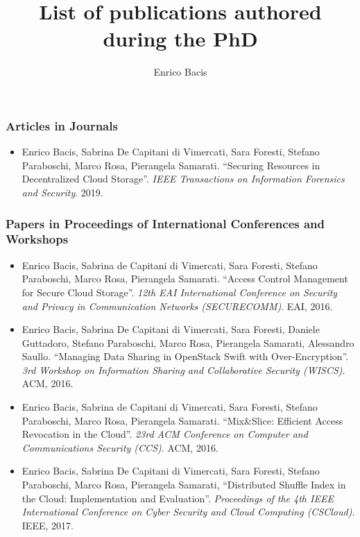 \documentclass[a4paper]{article}
\title{List of publications authored during the PhD}
\author{Enrico Bacis}
\date{}
\begin{document}
\maketitle

\begin{sloppy}
	
	\vspace{0.3em}
	
	\subsubsection*{Articles in Journals}
	\begin{itemize}
		\item Enrico Bacis, Sabrina De Capitani di Vimercati, Sara Foresti, Stefano Paraboschi,	Marco Rosa,	Pierangela Samarati. ``Securing Resources in Decentralized Cloud Storage''. {\em IEEE Transactions on Information Forensics and Security}. 2019.
	\end{itemize}
	
	\subsubsection*{Papers in Proceedings of International Conferences and Workshops}
	\begin{itemize}	

		\item Enrico Bacis, Sabrina de Capitani di Vimercati, Sara Foresti, Stefano Paraboschi, Marco Rosa, Pierangela Samarati. ``Access Control Management for Secure Cloud Storage''. {\em 12th EAI International Conference on Security and Privacy in Communication Networks (SECURECOMM)}. EAI, 2016.
		
		\item Enrico Bacis, Sabrina De Capitani di Vimercati, Sara Foresti, Daniele Guttadoro, Stefano Paraboschi, Marco Rosa, Pierangela Samarati, Alessandro Saullo. ``Managing Data Sharing in OpenStack Swift with Over-Encryption''. {\em 3rd Workshop on Information Sharing and Collaborative Security (WISCS)}. ACM, 2016.
		
		\item Enrico Bacis, Sabrina de Capitani di Vimercati, Sara Foresti, Stefano Paraboschi, Marco Rosa, Pierangela Samarati. ``Mix\&Slice: Efficient Access Revocation in the Cloud''. {\em 23rd ACM Conference on Computer and Communications Security (CCS)}. ACM, 2016.
		
		\item Enrico Bacis, Sabrina De Capitani di Vimercati, Sara Foresti, Stefano Paraboschi, Marco Rosa, Pierangela Samarati, ``Distributed Shuffle Index in the Cloud: Implementation and Evaluation''. {\em Proceedings of the 4th IEEE International Conference on Cyber Security and Cloud Computing (CSCloud)}. IEEE, 2017.
		

\end{itemize}
\end{sloppy}
\end{document}
